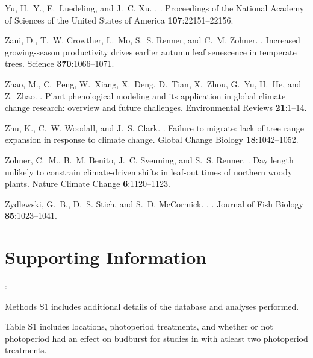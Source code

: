 \documentclass{article}
\begin{document}
\begin{thebibliography}{131}
Yu, H.~Y., E.~Luedeling, and J.~C. Xu.
.
.
\newblock Proceedings of the National Academy of Sciences of the United States
  of America {\bf 107}:22151--22156.

Zani, D., T.~W. Crowther, L.~Mo, S.~S. Renner, and C.~M. Zohner.
.
\newblock Increased growing-season productivity drives earlier autumn leaf
  senescence in temperate trees.
\newblock Science {\bf 370}:1066--1071.

Zhao, M., C.~Peng, W.~Xiang, X.~Deng, D.~Tian, X.~Zhou, G.~Yu, H.~He, and
  Z.~Zhao.
.
\newblock Plant phenological modeling and its application in global climate
  change research: overview and future challenges.
\newblock Environmental Reviews {\bf 21}:1--14.

Zhu, K., C.~W. Woodall, and J.~S. Clark.
.
\newblock Failure to migrate: lack of tree range expansion in response to
  climate change.
\newblock Global Change Biology {\bf 18}:1042--1052.

Zohner, C.~M., B.~M. Benito, J.~C. Svenning, and S.~S. Renner.
.
\newblock Day length unlikely to constrain climate-driven shifts in leaf-out
  times of northern woody plants.
\newblock Nature Climate Change {\bf 6}:1120--1123.

Zydlewski, G.~B., D.~S. Stich, and S.~D. McCormick.
.
.
\newblock Journal of Fish Biology {\bf 85}:1023--1041.

\end{thebibliography}

%
\clearpage

\section*{Supporting Information}:
\par Methods S1 includes additional details of the database and analyses performed.
\par Table S1 includes locations, photoperiod treatments, and whether or not photoperiod had an effect on budburst for studies in \citet{wolkovich2019} with atleast two photoperiod treatments. 
\end{document}
